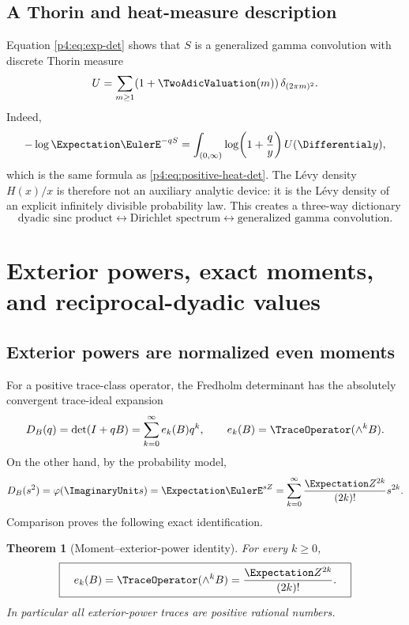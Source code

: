 \documentclass[11pt]{article}
\newtheorem{theorem}{Theorem}[section]
\theoremstyle{definition}
\theoremstyle{remark}
\newcommand{\phiF}{\varphi}
\begin{document}
\subsection{A Thorin and heat-measure description}

Equation \eqref{p4:eq:exp-det} shows that \(S\) is a generalized gamma convolution with
discrete Thorin measure
\begin{equation}
 U=\sum_{m\ge1}(1+\TwoAdicValuation(m))\,\delta_{(2\pi m)^2}.
 \label{p4:eq:Thorin}
\end{equation}
Indeed,
\begin{equation}
 -\log\Expectation\EulerE^{-qS}
 =\int_{(0,\infty)}\log\!\left(1+\frac qy\right)U(\Differential y),
 \label{p4:eq:Thorin-log}
\end{equation}
which is the same formula as \eqref{p4:eq:positive-heat-det}.  The L\'evy density
\(H(x)/x\) is therefore not an auxiliary analytic device: it is the L\'evy density of
an explicit infinitely divisible probability law.  This creates a three-way dictionary
\[
 \text{dyadic sinc product}
 \longleftrightarrow
 \text{Dirichlet spectrum}
 \longleftrightarrow
 \text{generalized gamma convolution}.
\]

\section{Exterior powers, exact moments, and reciprocal-dyadic values}
\label{p4:sec:exterior-dyadic}

\subsection{Exterior powers are normalized even moments}

For a positive trace-class operator, the Fredholm determinant has the absolutely
convergent trace-ideal expansion~\cite{p4:SimonTrace,p4:GohbergKrein}
\begin{equation}
 D_B(q)=\det(I+qB)=\sum_{k=0}^{\infty}e_k(B)q^k,
 \qquad
 e_k(B)=\TraceOperator(\wedge^kB).
 \label{p4:eq:det-exterior-expansion}
\end{equation}
On the other hand, by the probability model,
\begin{equation}
 D_B(s^2)=\phiF(\ImaginaryUnit s)=\Expectation\EulerE^{sZ}
 =\sum_{k=0}^{\infty}\frac{\Expectation Z^{2k}}{(2k)!}s^{2k}.
 \label{p4:eq:mgf-exterior}
\end{equation}
Comparison proves the following exact identification.

\begin{theorem}[Moment--exterior-power identity]
\label{p4:thm:moment-exterior}
For every \(k\ge0\),
\begin{equation}
 \boxed{\quad
 e_k(B)=\TraceOperator(\wedge^kB)=\frac{\Expectation Z^{2k}}{(2k)!}.
 \quad}
 \label{p4:eq:moment-exterior}
\end{equation}
In particular all exterior-power traces are positive rational numbers.
\end{theorem}
\end{document}
